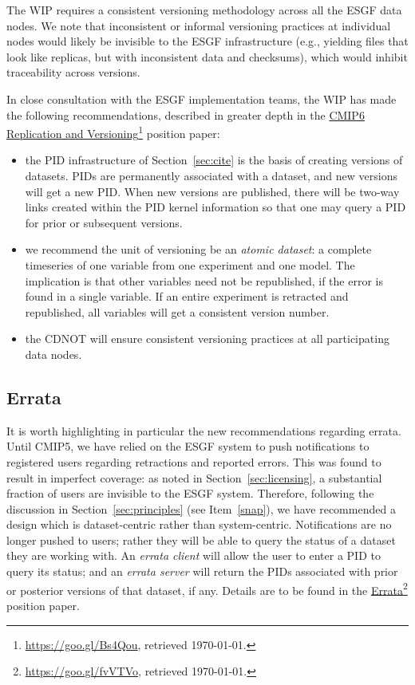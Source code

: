 \documentclass[gmd,manuscript]{copernicus}
\newcommand{\urlref}[2] {\href{#1}{#2}\footnote{\url{#1}, retrieved \today.}}
\begin{document}
The WIP requires a consistent versioning methodology across all the
ESGF data nodes. We note that inconsistent or informal versioning
practices at individual nodes would likely be invisible to the ESGF
infrastructure (e.g., yielding files that look like replicas, but with
inconsistent data and checksums), which would inhibit traceability
across versions.

In close consultation with the ESGF implementation teams, the WIP has
made the following recommendations, described in greater depth in the
\urlref{https://goo.gl/Bs4Qou}{CMIP6 Replication and Versioning}
position paper:

\begin{itemize}
\item the PID infrastructure of Section~\ref{sec:cite} is the basis of
  creating versions of datasets. PIDs are permanently associated with
  a dataset, and new versions will get a new PID. When new versions
  are published, there will be two-way links created within the PID
  kernel information so that one may query a PID for prior or
  subsequent versions.
\item we recommend the unit of versioning be an \emph{atomic dataset}:
  a complete timeseries of one variable from one experiment and one
  model. The implication is that other variables need not be
  republished, if the error is found in a single variable. If an
  entire experiment is retracted and republished, all variables will
  get a consistent version number.
\item the CDNOT will ensure consistent versioning practices at all
  participating data nodes.
\end{itemize}

\subsection{Errata}
\label{sec:errata}

It is worth highlighting in particular the new recommendations
regarding errata. Until CMIP5, we have relied on the ESGF system to
push notifications to registered users regarding retractions and
reported errors. This was found to result in imperfect coverage: as
noted in Section~\ref{sec:licensing}, a substantial fraction of users
are invisible to the ESGF system. Therefore, following the discussion
in Section~\ref{sec:principles} (see Item~\ref{snap}), we have
recommended a design which is dataset-centric rather than
system-centric. Notifications are no longer pushed to users; rather
they will be able to query the status of a dataset they are working
with. An \emph{errata client} will allow the user to enter a PID to
query its status; and an \emph{errata server} will return the PIDs
associated with prior or posterior versions of that dataset, if any.
Details are to be found in the \urlref{https://goo.gl/fvVTVo}{Errata}
position paper.
\end{document}
